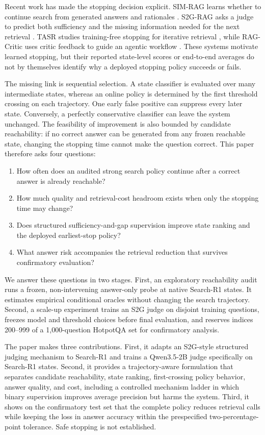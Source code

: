 \documentclass[11pt,a4paper]{article}
\begin{document}
Recent work has made the stopping decision explicit. SIM-RAG learns whether to continue search from generated answers and rationales \citep{yang2025simrag}. S2G-RAG asks a judge to predict both sufficiency and the missing information needed for the next retrieval \citep{li2026s2grag}. TASR studies training-free stopping for iterative retrieval \citep{kieback2026tasr}, while RAG-Critic uses critic feedback to guide an agentic workflow \citep{dong2025ragcritic}. These systems motivate learned stopping, but their reported state-level scores or end-to-end averages do not by themselves identify why a deployed stopping policy succeeds or fails.

The missing link is sequential selection. A state classifier is evaluated over many intermediate states, whereas an online policy is determined by the first threshold crossing on each trajectory. One early false positive can suppress every later state. Conversely, a perfectly conservative classifier can leave the system unchanged. The feasibility of improvement is also bounded by candidate reachability: if no correct answer can be generated from any frozen reachable state, changing the stopping time cannot make the question correct. This paper therefore asks four questions:

\begin{enumerate}[leftmargin=*]
  \item How often does an audited strong search policy continue after a correct answer is already reachable?
  \item How much quality and retrieval-cost headroom exists when only the stopping time may change?
  \item Does structured sufficiency-and-gap supervision improve state ranking and the deployed earliest-stop policy?
  \item What answer risk accompanies the retrieval reduction that survives confirmatory evaluation?
\end{enumerate}

We answer these questions in two stages. First, an exploratory reachability audit runs a frozen, non-intervening answer-only probe at native Search-R1 states. It estimates empirical conditional oracles without changing the search trajectory. Second, a scale-up experiment trains an S2G judge on disjoint training questions, freezes model and threshold choices before final evaluation, and reserves indices 200--999 of a 1,000-question HotpotQA set for confirmatory analysis.

The paper makes three contributions. First, it adapts an S2G-style structured judging mechanism to Search-R1 and trains a Qwen3.5-2B judge specifically on Search-R1 states. Second, it provides a trajectory-aware formulation that separates candidate reachability, state ranking, first-crossing policy behavior, answer quality, and cost, including a controlled mechanism ladder in which binary supervision improves average precision but harms the system. Third, it shows on the confirmatory test set that the complete policy reduces retrieval calls while keeping the loss in answer accuracy within the prespecified two-percentage-point tolerance. Safe stopping is not established.
\end{document}
